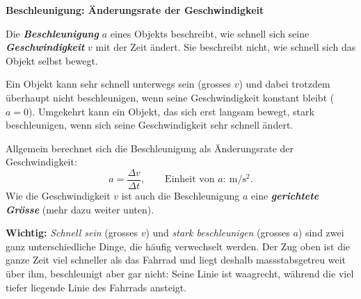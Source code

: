 \documentclass[addpoints,11pt,a4paper]{exam}
\newenvironment{theoriebox}[1][Theorie]{%
  \par\addvspace{10pt}\noindent\textbf{#1}\par\smallskip\noindent
}{%
  \par\addvspace{10pt}
}
\begin{document}
\begin{theoriebox}[Beschleunigung: Änderungsrate der Geschwindigkeit]
Die \textbf{\emph{Beschleunigung}} $a$ eines Objekts beschreibt, wie
schnell sich seine \textbf{\emph{Geschwindigkeit}} $v$ mit der Zeit
ändert. Sie beschreibt nicht, wie schnell sich das Objekt selbst bewegt.

Ein Objekt kann sehr schnell unterwegs sein (grosses $v$) und dabei
trotzdem überhaupt nicht beschleunigen, wenn seine Geschwindigkeit
konstant bleibt ($a=0$). Umgekehrt kann ein Objekt, das sich erst
langsam bewegt, stark beschleunigen, wenn sich seine Geschwindigkeit
sehr schnell ändert.

\begin{formelbox}
Allgemein berechnet sich die Beschleunigung als Änderungsrate der
Geschwindigkeit:
\[
  a = \frac{\Delta v}{\Delta t}, \qquad
  \text{Einheit von } a\colon\ \si{\meter\per\second\squared}.
\]
Wie die Geschwindigkeit $v$ ist auch die Beschleunigung $a$ eine
\textbf{\emph{gerichtete Grösse}} (mehr dazu weiter unten).
\end{formelbox}

\begin{center}
\end{center}

\textbf{Wichtig:} \emph{Schnell sein} (grosses $v$) und \emph{stark
beschleunigen} (grosses $a$) sind zwei ganz unterschiedliche Dinge, die
häufig verwechselt werden. Der Zug oben ist die ganze Zeit viel
schneller als das Fahrrad und liegt deshalb massstabsgetreu weit über
ihm, beschleunigt aber gar nicht: Seine Linie ist waagrecht, während die
viel tiefer liegende Linie des Fahrrads ansteigt.
\end{theoriebox}
\end{document}
